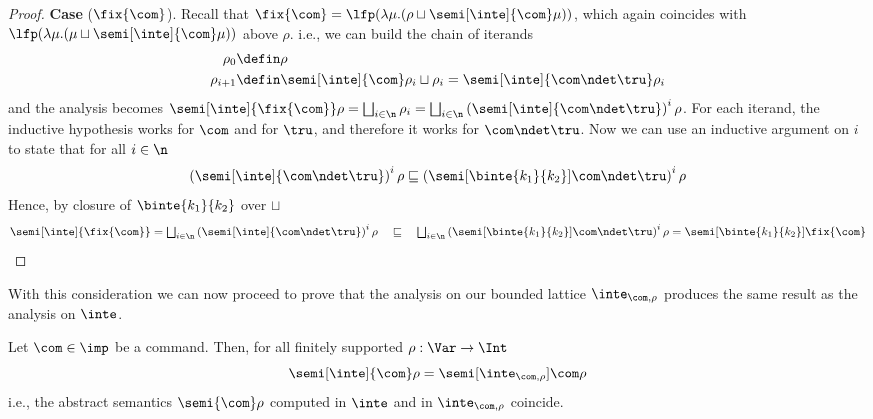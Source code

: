 \begin{proof}
  \noindent
  \textbf{Case} (\(\fix{\com}\)).
  Recall that
  \(\fix{\com} = {\lfp(\lambda \mu . (\rho \sqcup
    \semi[\inte]{\com}\mu))}\), which again coincides with
  \({\lfp(\lambda \mu . (\mu \sqcup \semi[\inte]{\com}\mu))}\) above
  \(\rho\). i.e., we can build the chain of iterands
  \begin{align*}
    \rho_0 & \defin \rho \\
    \rho_{i+1} & \defin \semi[\inte]{\com}\rho_i \sqcup \rho_i = \semi[\inte]{\com \ndet \tru}\rho_i
  \end{align*}
  and the analysis becomes
  \({\semi[\inte]{\fix{\com}}\rho} =
  {\textstyle\bigsqcup_{i\in\n}\rho_i} =
  {\textstyle\bigsqcup_{i\in\n}\left(\semi[\inte]{\com \ndet
        \tru}\right)^i\rho}\).  For each iterand, the inductive
  hypothesis works for \(\com\) and for \(\tru\), and therefore it
  works for \(\com \ndet \tru\). Now we can use an inductive argument
  on \(i\) to state that for all \(i \in\n\)
  \begin{equation*}
    {\left(\semi[\inte]{\com\ndet\tru}\right)^i\rho} \sqsubseteq {\left(\semi[\binte{k_1}{k_2}]{\com\ndet\tru}\right)^i\rho}
  \end{equation*}
  Hence, by closure of \(\binte{k_1}{k_2}\) over \(\sqcup\)
  \begin{equation*}
    {\semi[\inte]{\fix{\com}}} =
    {\textstyle\bigsqcup_{i\in\n}\left(\semi[\inte]{\com\ndet\tru}\right)^i \rho}
    \quad \sqsubseteq \quad
    {\textstyle\bigsqcup_{i\in\n}\left(\semi[\binte{k_1}{k_2}]{\com\ndet\tru}\right)^i \rho} =
    {\semi[\binte{k_1}{k_2}]{\fix{\com}}}
  \end{equation*}

\end{proof}
With this consideration we can now proceed to prove that the analysis
on our bounded lattice \(\inte_{\com,\rho}\) produces the same result
as the analysis on \(\inte\).



\begin{theorem}
  Let \(\com\in \imp\) be a command. Then, for all finitely supported
  \(\rho : \Var \to \Int\)
  \begin{equation*}
    \semi[\inte]{\com}\rho = \semi[\inte_{\com,\rho}]{\com}\rho
  \end{equation*}
  i.e., the abstract semantics \(\semi{\com} \rho\)
  computed in \(\inte\) and in \(\inte_{\com,\rho}\) coincide.
\end{theorem}

